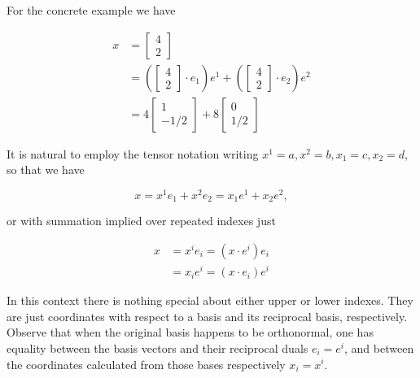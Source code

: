 \documentclass[iop,onecolumn]{emulateapj}
\begin{document}
For the concrete example we have

\begin{equation}\label{eqn:grahamSchmidtLorentz:290}
\begin{aligned}
x
&=
\begin{bmatrix}
4 \\
2
\end{bmatrix} \\
&=
\left(
\begin{bmatrix}
4 \\
2
\end{bmatrix}
\cdot e_1
\right)
e^1
+
\left(
\begin{bmatrix}
4 \\
2
\end{bmatrix}
\cdot e_2
\right)
e^2 \\
&= 4
\begin{bmatrix}
1 \\
-1/2
\end{bmatrix}
+
8
\begin{bmatrix}
0 \\
1/2
\end{bmatrix}
\end{aligned}
\end{equation}

It is natural to employ the tensor notation writing $x^1 = a, x^2 = b, x_1 = c, x_2 = d$, so that we have

\begin{equation}\label{eqn:grahamSchmidtLorentz:310}
x = x^1 e_1 + x^2 e_2 = x_1 e^1 + x_2 e^2,
\end{equation}

or with summation implied over repeated indexes just

\begin{equation}\label{eqn:grahamSchmidtLorentz:330}
\begin{aligned}
x &= x^i e_i = (x \cdot e^i) e_i \\
  &= x_i e^i = (x \cdot e_i) e^i
\end{aligned}
\end{equation}

In this context there is nothing special about either upper or lower indexes.  They are just coordinates with respect to a basis and its reciprocal basis, respectively.  Observe that when the original basis happens to be orthonormal, one has equality between the basis vectors and their reciprocal duals $e_i = e^i$, and between the coordinates calculated from those bases respectively $x_i = x^i$.
\end{document}
